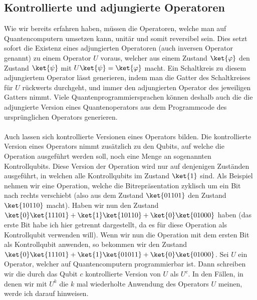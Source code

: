\subsection{Kontrollierte und adjungierte Operatoren}
Wie wir bereits erfahren haben, müssen die Operatoren, welche man auf Quantencomputern umsetzen kann, unitär und somit reversibel sein. Dies setzt sofort die Existenz eines adjungierten Operatoren (auch inversen Operator genannt) zu einem Operator $U$ voraus, welcher aus einem Zustand $\ket{\varphi}$ den Zustand $\ket{\psi}$ mit $U\ket{\psi} = \ket{\varphi}$ macht. Ein Schaltkreis zu diesem adjungiertem Operator lässt generieren, indem man die Gatter des Schaltkreises für $U$ rückwerts durchgeht, und immer den adjungierten Operator des jeweiligen Gatters nimmt. Viele Quantenprogrammiersprachen können deshalb auch die die adjungierte Version eines Quantenoperators aus dem Programmcode des ursprünglichen Operators generieren.

\paragraph{}
Auch lassen sich kontrollierte Versionen eines Operators bilden. Die kontrollierte Version eines Operators nimmt zusätzlich zu den Qubits, auf welche die Operation ausgeführt werden soll, noch eine Menge an sogenannten Kontrollqubits. Diese Version der Operation wird nur auf denjenigen Zuständen ausgeführt, in welchen alle Kontrollqubits im Zustand $\ket{1}$ sind. Als Beispiel nehmen wir eine Operation, welche die Bitrepräsentation zyklisch um ein Bit nach rechts verschiebt (also aus dem Zustand $\ket{01101}$ den Zustand $\ket{10110}$ macht). Haben wir nun den Zustand $\ket{0}\ket{11101} + \ket{1}\ket{10110} + \ket{0}\ket{01000}$ haben (das erste Bit habe ich hier getrennt dargestellt, da es für diese Operation als Kontrollqubit verwenden will). Wenn wir nun die Operation mit dem ersten Bit als Kontrollqubit anwenden, so bekommen wir den Zustand $\ket{0}\ket{11101} + \ket{1}\ket{01011} + \ket{0}\ket{01000}$. Sei $U$ ein Operator, welcher auf Quantencomputern programmierbar ist. Dann schreiben wir die durch das Qubit $c$ kontrollierte Version von $U$ als $U^c$. In den Fällen, in denen wir mit $U^k$ die $k$ mal wiederholte Anwendung des Operators $U$ meinen, werde ich darauf hinweisen.

\paragraph{}


